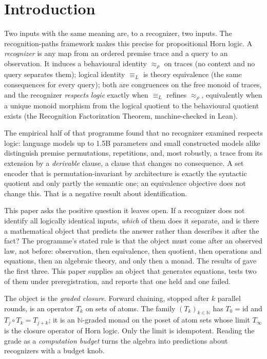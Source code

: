 \begin{abstract}
and clause count, and was found by testing laws rather than by assuming them.
\end{abstract}

\section{Introduction}\label{introduction}

Two inputs with the same meaning are, to a recognizer, two inputs. The recognition-paths framework \cite{rp2026} makes this precise for propositional Horn logic. A \emph{recognizer} is any map from an ordered premise trace and a query to an observation. It induces a behavioural identity \(\approx_\rho\) on traces (no context and no query separates them); logical identity \(\equiv_L\) is theory equivalence (the same consequences for every query); both are congruences on the free monoid of traces, and the recognizer \emph{respects logic} exactly when \(\equiv_L\) refines \(\approx_\rho\), equivalently when a unique monoid morphism from the logical quotient to the behavioural quotient exists (the Recognition Factorization Theorem, machine-checked in Lean).

The empirical half of that programme \cite{ppi2026} found that no recognizer examined respects logic: language models up to 1.5B parameters and small constructed models alike distinguish premise permutations, repetitions, and, most robustly, a trace from its extension by a \emph{derivable} clause, a clause that changes no consequence. A set encoder that is permutation-invariant by architecture is exactly the syntactic quotient and only partly the semantic one; an equivalence objective does not change this. That is a negative result about identification.

This paper asks the positive question it leaves open. If a recognizer does not identify all logically identical inputs, \emph{which} of them does it separate, and is there a mathematical object that predicts the answer rather than describes it after the fact? The programme's stated rule is that the object must come after an observed law, not before: observation, then equivalence, then quotient, then operations and equations, then an algebraic theory, and only then a monad. The results of \cite{ppi2026} gave the first three. This paper supplies an object that generates equations, tests two of them under preregistration, and reports that one held and one failed.

The object is the \emph{graded closure}. Forward chaining, stopped after \(k\) parallel rounds, is an operator \(T_k\) on sets of atoms. The family \((T_k)_{k\in\mathbb N}\) has \(T_0=\mathrm{id}\) and \(T_j\circ T_k=T_{j+k}\); it is an \(\mathbb N\)-graded monad on the poset of atom sets \cite{smirnov2008,fujii2016} whose limit \(T_\infty\) is the closure operator of Horn logic. Only the limit is idempotent. Reading the grade as a \emph{computation budget} turns the algebra into predictions about recognizers with a budget knob.

